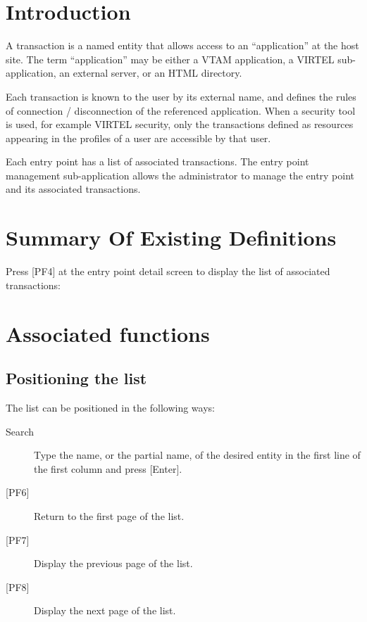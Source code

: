 \documentclass[letterpaper,10pt,english]{sphinxmanual}
\begin{document}
\section{Introduction}
\label{\detokenize{connectivity_guide:id12}}
A transaction is a named entity that allows access to an “application” at the host site. The term “application” may be either a VTAM application, a VIRTEL sub-application, an external server, or an HTML directory.

Each transaction is known to the user by its external name, and defines the rules of connection / disconnection of the referenced application. When a security tool is used, for example VIRTEL security, only the transactions defined as resources appearing in the profiles of a user are accessible by that user.

Each entry point has a list of associated transactions. The entry point management sub-application allows the administrator to manage the entry point and its associated transactions.


\section{Summary Of Existing Definitions}
\label{\detokenize{connectivity_guide:id13}}
Press {[}PF4{]} at the entry point detail screen to display the list of associated transactions:




\section{Associated functions}
\label{\detokenize{connectivity_guide:id14}}

\subsection{Positioning the list}
\label{\detokenize{connectivity_guide:id15}}
The list can be positioned in the following ways:
\begin{description}
\item[{Search}] \leavevmode
Type the name, or the partial name, of the desired entity in the first line of the first column and press {[}Enter{]}.

\item[{{[}PF6{]}}] \leavevmode
Return to the first page of the list.

\item[{{[}PF7{]}}] \leavevmode
Display the previous page of the list.

\item[{{[}PF8{]}}] \leavevmode
Display the next page of the list.

\end{description}
\end{document}
